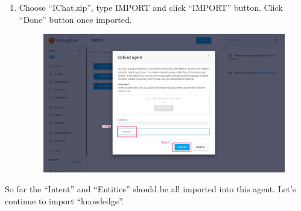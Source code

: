 \begin{enumerate}
	\item Choose “IChat.zip”, type IMPORT and click “IMPORT” button. Click “Done” button once imported.

	\begin{figure}[H]
		\centering
		\includegraphics[width=\linewidth, frame]{img/manual_6.jpg}
	\end{figure}
\end{enumerate}

So far the “Intent” and “Entities” should be all imported into this agent.
Let’s continue to import “knowledge”.


